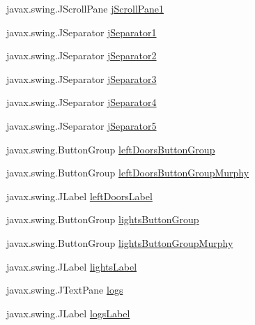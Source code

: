 \begin{DoxyCompactItemize}
\item 
javax.\+swing.\+J\+Scroll\+Pane \hyperlink{classTrainControllerComps_1_1TCTestConsole_a5ee544c3a96aebcfc3fb359811f53e17}{j\+Scroll\+Pane1}
\item 
javax.\+swing.\+J\+Separator \hyperlink{classTrainControllerComps_1_1TCTestConsole_aa6e341ad4a933305c208ddfab87b7748}{j\+Separator1}
\item 
javax.\+swing.\+J\+Separator \hyperlink{classTrainControllerComps_1_1TCTestConsole_a321b1c444b86da9a4c8dd6a5e5206d44}{j\+Separator2}
\item 
javax.\+swing.\+J\+Separator \hyperlink{classTrainControllerComps_1_1TCTestConsole_aeb40f199fd2cfcb8f20110d13ddc43ae}{j\+Separator3}
\item 
javax.\+swing.\+J\+Separator \hyperlink{classTrainControllerComps_1_1TCTestConsole_ab4b1231ce9b294b2765bb91c44522e3c}{j\+Separator4}
\item 
javax.\+swing.\+J\+Separator \hyperlink{classTrainControllerComps_1_1TCTestConsole_a5907933373af800e343932b74f2b5953}{j\+Separator5}
\item 
javax.\+swing.\+Button\+Group \hyperlink{classTrainControllerComps_1_1TCTestConsole_a6e9e34dbae54de3d18973079a119b259}{left\+Doors\+Button\+Group}
\item 
javax.\+swing.\+Button\+Group \hyperlink{classTrainControllerComps_1_1TCTestConsole_a31e351b69749abd5011ab27db71f2c93}{left\+Doors\+Button\+Group\+Murphy}
\item 
javax.\+swing.\+J\+Label \hyperlink{classTrainControllerComps_1_1TCTestConsole_a019c8a0ab8654c401c1e34d4d02237f9}{left\+Doors\+Label}
\item 
javax.\+swing.\+Button\+Group \hyperlink{classTrainControllerComps_1_1TCTestConsole_a19ea08b80e017c2370d6a71e6f2c9688}{lights\+Button\+Group}
\item 
javax.\+swing.\+Button\+Group \hyperlink{classTrainControllerComps_1_1TCTestConsole_ade57cb3a0c1580b921e0ff5ad758c80a}{lights\+Button\+Group\+Murphy}
\item 
javax.\+swing.\+J\+Label \hyperlink{classTrainControllerComps_1_1TCTestConsole_ac6b7301f535cea9ef8d39ba8d9e21bc3}{lights\+Label}
\item 
javax.\+swing.\+J\+Text\+Pane \hyperlink{classTrainControllerComps_1_1TCTestConsole_acb8f9a2f8b463f489504ceb2632e0472}{logs}
\item 
javax.\+swing.\+J\+Label \hyperlink{classTrainControllerComps_1_1TCTestConsole_a863cecfa16a93d7a4e220853a7202a80}{logs\+Label}
\item 

\end{DoxyCompactItemize}
